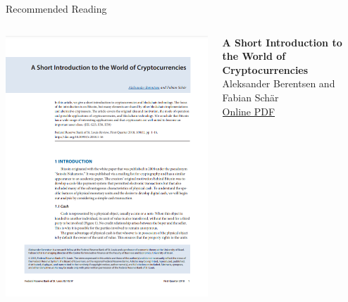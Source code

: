 \documentclass[]{beamer}
\begin{document}
\begin{frame}{Recommended Reading}
\begin{columns}
	\begin{column}{0.3\textwidth}
	\center
	\includegraphics[width=\textwidth , frame]{../assets/images/short-introduction-cryptocurrencies.png}
	\end{column}
	\begin{column}{0.7\textwidth}
	\textbf{A Short Introduction to the World of Cryptocurrencies} \\
	Aleksander Berentsen and Fabian Schär \\
	\link \href{https://files.stlouisfed.org/files/htdocs/publications/review/2018/01/10/a-short-introduction-to-the-world-of-cryptocurrencies.pdf}{Online PDF}
	\end{column}
\end{columns}
\end{frame}
\end{document}

